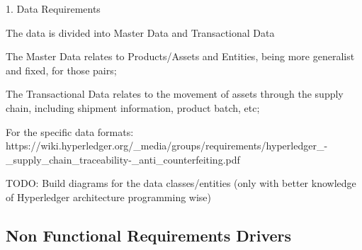 	1. Data Requirements
		\par The data is divided into Master Data and Transactional Data
		\par The Master Data relates to Products/Assets and Entities, being more generalist and fixed, for those pairs;
		\par The Transactional Data relates to the movement of assets through the supply chain, including shipment information, product batch, etc;
		\par For the specific data formats: https://wiki.hyperledger.org/\_media/groups/requirements/hyperledger\_-\_supply\_chain\_traceability-\_anti\_counterfeiting.pdf
		\par TODO: Build diagrams for the data classes/entities (only with better knowledge of Hyperledger architecture programming wise)
		
		

\subsection{Non Functional Requirements Drivers}


